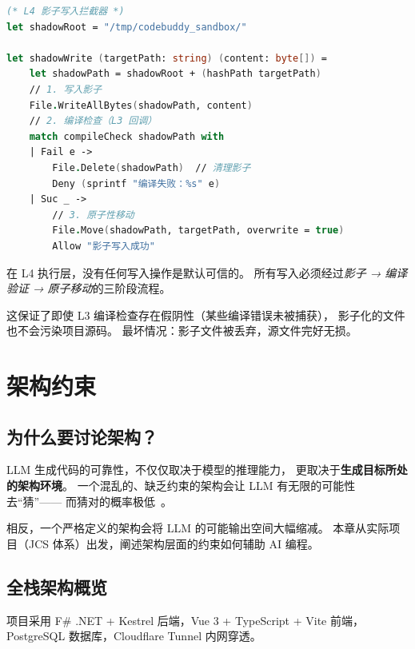 \documentclass[10pt, openany]{book}
\begin{document}
\begin{lstlisting}[language=FSharp]
(* L4 影子写入拦截器 *)
let shadowRoot = "/tmp/codebuddy_sandbox/"

let shadowWrite (targetPath: string) (content: byte[]) =
    let shadowPath = shadowRoot + (hashPath targetPath)
    // 1. 写入影子
    File.WriteAllBytes(shadowPath, content)
    // 2. 编译检查（L3 回调）
    match compileCheck shadowPath with
    | Fail e -> 
        File.Delete(shadowPath)  // 清理影子
        Deny (sprintf "编译失败：%s" e)
    | Suc _ ->
        // 3. 原子性移动
        File.Move(shadowPath, targetPath, overwrite = true)
        Allow "影子写入成功"
\end{lstlisting}

\begin{principle}[零信任写入]
    在 L4 执行层，没有任何写入操作是默认可信的。
    所有写入必须经过\emph{影子 → 编译验证 → 原子移动}的三阶段流程。
    
    这保证了即使 L3 编译检查存在假阴性（某些编译错误未被捕获），
    影子化的文件也不会污染项目源码。
    最坏情况：影子文件被丢弃，源文件完好无损。
\end{principle}

\chapter{架构约束}

\section{为什么要讨论架构？}

LLM 生成代码的可靠性，不仅仅取决于模型的推理能力，
更取决于\textbf{生成目标所处的架构环境}。
一个混乱的、缺乏约束的架构会让 LLM 有无限的可能性去``猜''——
而猜对的概率极低~\cite{Chen2021Codex}。

相反，一个严格定义的架构会将 LLM 的可能输出空间大幅缩减。
本章从实际项目（JCS 体系）出发，阐述架构层面的约束如何辅助 AI 编程。

\section{全栈架构概览}

项目采用 F\# .NET + Kestrel 后端，Vue 3 + TypeScript + Vite 前端，
PostgreSQL 数据库，Cloudflare Tunnel 内网穿透。
\end{document}

